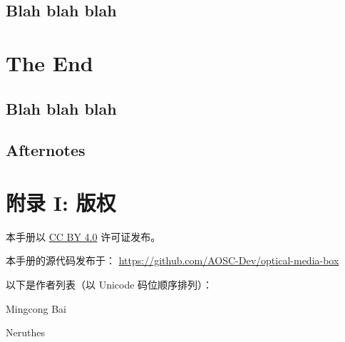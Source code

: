     \section{Blah blah blah}
    \lipsum[1]



    \chapter{The End}
    \lipsum[1]
    
    \section{Blah blah blah}
    \lipsum[1]
    


    \section{Afternotes}
    \lipsum[1]
    
    \lipsum[1]



    \chapter{附录 I: 版权}

    本手册以 \underline{CC BY 4.0} 许可证发布。

    本手册的源代码发布于：\newline
    \hspace{2em}\underline{\ttfamily\footnotesize{https://github.com/AOSC-Dev/optical-media-box}}

    \vspace{1ex}以下是作者列表（以 Unicode 码位顺序排列）：

    \begin{compactitem}
        \item Mingcong Bai
        \item Neruthes
    \end{compactitem}

    \pagestyle{empty}
    \cleardoublepage
